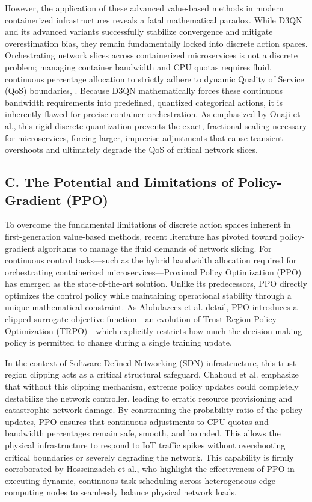 However, the application of these advanced value-based methods in modern containerized infrastructures reveals a fatal mathematical paradox. While D3QN and its advanced variants successfully stabilize convergence and mitigate overestimation bias, they remain fundamentally locked into discrete action spaces\cite{b13}. Orchestrating network slices across containerized microservices is not a discrete problem; managing container bandwidth and CPU quotas requires fluid, continuous percentage allocation to strictly adhere to dynamic Quality of Service (QoS) boundaries\cite{b6}, \cite{b39}. Because D3QN mathematically forces these continuous bandwidth requirements into predefined, quantized categorical actions, it is inherently flawed for precise container orchestration\cite{b6}. As emphasized by Onaji et al., this rigid discrete quantization prevents the exact, fractional scaling necessary for microservices, forcing larger, imprecise adjustments that cause transient overshoots and ultimately degrade the QoS of critical network slices\cite{b6}.

\subsection{C. The Potential and Limitations of Policy-Gradient (PPO)}\label{c.-the-potential-and-limitations-of-policy-gradient-ppo}

To overcome the fundamental limitations of discrete action spaces inherent in first-generation value-based methods, recent literature has pivoted toward policy-gradient algorithms to manage the fluid demands of network slicing. For continuous control tasks---such as the hybrid bandwidth allocation required for orchestrating containerized microservices---Proximal Policy Optimization (PPO) has emerged as the state-of-the-art solution. Unlike its predecessors, PPO directly optimizes the control policy while maintaining operational stability through a unique mathematical constraint. As Abdulazeez et al. detail, PPO introduces a clipped surrogate objective function---an evolution of Trust Region Policy Optimization (TRPO)---which explicitly restricts how much the decision-making policy is permitted to change during a single training update\cite{b40}.

In the context of Software-Defined Networking (SDN) infrastructure, this trust region clipping acts as a critical structural safeguard. Chahoud et al. emphasize that without this clipping mechanism, extreme policy updates could completely destabilize the network controller, leading to erratic resource provisioning and catastrophic network damage\cite{b18}. By constraining the probability ratio of the policy updates, PPO ensures that continuous adjustments to CPU quotas and bandwidth percentages remain safe, smooth, and bounded. This allows the physical infrastructure to respond to IoT traffic spikes without overshooting critical boundaries or severely degrading the network\cite{b18}. This capability is firmly corroborated by Hosseinzadeh et al., who highlight the effectiveness of PPO in executing dynamic, continuous task scheduling across heterogeneous edge computing nodes to seamlessly balance physical network loads\cite{b15}.

